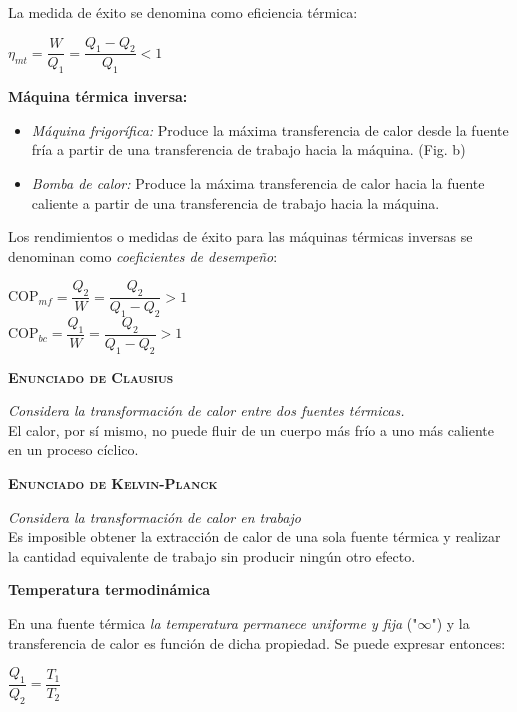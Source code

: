 \documentclass[11pt,a4paper,twocolumn]{article}
\begin{document}
	 La medida de éxito se denomina como eficiencia térmica:
	 \begin{center}
	 	$\eta_{mt}=\dfrac{W}{Q_{1}}=\dfrac{Q_{1}-Q_{2}}{Q_{1}} < 1$
	 \end{center}
	
	
	\textbf{Máquina térmica inversa:}
	\begin{itemize}
		\item \emph{Máquina frigorífica:} Produce la máxima transferencia de calor desde la fuente fría a partir de una transferencia de trabajo hacia la máquina. (Fig. b)
		\item \emph{Bomba de calor:} Produce la máxima transferencia de calor hacia la fuente caliente a partir de una transferencia de trabajo hacia la máquina.
	\end{itemize}
	
	 Los rendimientos o medidas de éxito para las máquinas térmicas inversas se denominan como \emph{coeficientes de desempeño}:
	 
	 \begin{center}
		COP$_{mf}=\dfrac{Q_{2}}{W}=\dfrac{Q_{2}}{Q_{1}-Q_{2}} > 1$ \\
		COP$_{bc}=\dfrac{Q_{1}}{W}=\dfrac{Q_{2}}{Q_{1}-Q_{2}} > 1$\\
	\end{center}

	
	
	\begin{center}
	\textsc{\textbf{Enunciado de Clausius}}
	
	\textsl{Considera la transformación de calor entre dos fuentes térmicas.} \\
	
	El calor, por sí mismo, no puede fluir de un cuerpo más frío a uno más caliente en un proceso cíclico. \vspace{.3cm}
	
	\textsc{\textbf{Enunciado de Kelvin-Planck}}
	
	\textsl{Considera la transformación de calor en trabajo}\\
	
	Es imposible obtener la extracción de calor de una sola fuente térmica y realizar la cantidad equivalente de trabajo sin producir ningún otro efecto.
	
	\end{center}
	
	\textbf{Temperatura termodinámica}
	
	En una fuente térmica \emph{la temperatura permanece uniforme y fija} ("$\infty$") y la transferencia de calor es función de dicha propiedad. Se puede expresar entonces:
	\begin{center}
		$\dfrac{Q_{1}}{Q_{2}}=\dfrac{T_{1}}{T_{2}}$
	\end{center}
	
\end{document}
